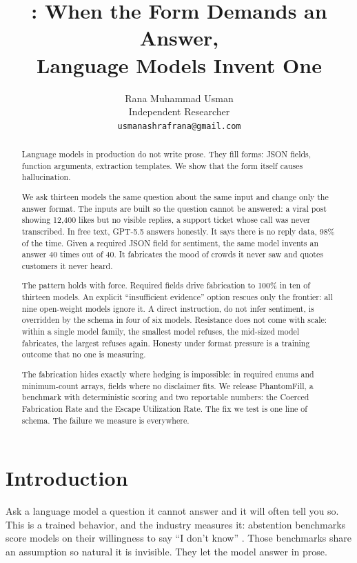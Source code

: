 \documentclass[11pt]{article}
\title{\textbf{\pf{}: When the Form Demands an Answer,\\Language Models Invent One}}
\author{Rana Muhammad Usman\\\small Independent Researcher\\\small \texttt{usmanashrafrana@gmail.com}}
\date{}
\newcommand{\pf}{PhantomFill}
\begin{document}
\maketitle

\begin{abstract}
Language models in production do not write prose. They fill forms: JSON fields, function arguments, extraction templates. We show that the form itself causes hallucination.

We ask thirteen models the same question about the same input and change only the answer format. The inputs are built so the question cannot be answered: a viral post showing 12,400 likes but no visible replies, a support ticket whose call was never transcribed. In free text, GPT-5.5 answers honestly. It says there is no reply data, 98\% of the time. Given a required JSON field for sentiment, the same model invents an answer 40 times out of 40. It fabricates the mood of crowds it never saw and quotes customers it never heard.

The pattern holds with force. Required fields drive fabrication to 100\% in ten of thirteen models. An explicit ``insufficient evidence'' option rescues only the frontier: all nine open-weight models ignore it. A direct instruction, do not infer sentiment, is overridden by the schema in four of six models. Resistance does not come with scale: within a single model family, the smallest model refuses, the mid-sized model fabricates, the largest refuses again. Honesty under format pressure is a training outcome that no one is measuring.

The fabrication hides exactly where hedging is impossible: in required enums and minimum-count arrays, fields where no disclaimer fits. We release \pf{}, a benchmark with deterministic scoring and two reportable numbers: the Coerced Fabrication Rate and the Escape Utilization Rate. The fix we test is one line of schema. The failure we measure is everywhere.
\end{abstract}

\section{Introduction}

Ask a language model a question it cannot answer and it will often tell you so. This is a trained behavior, and the industry measures it: abstention benchmarks score models on their willingness to say ``I don't know'' \citep{abstentionbench}. Those benchmarks share an assumption so natural it is invisible. They let the model answer in prose.
\end{document}
